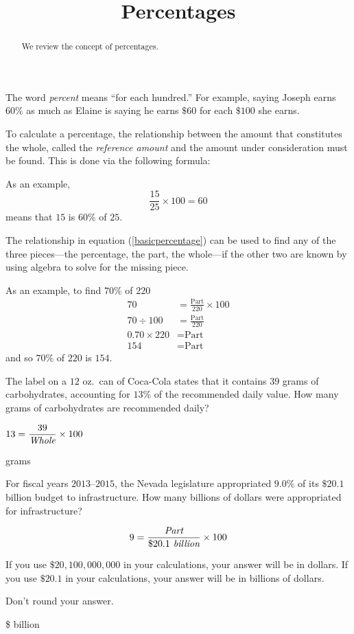 \documentclass{ximera}
\title{Percentages}
\begin{document}
\begin{abstract}
We review the concept of percentages.
\end{abstract}
\maketitle

The word \emph{percent} means ``for each hundred.'' For example, saying Joseph earns $60\%$ as much as Elaine is saying he earns $\$60$ for each $\$100$ she earns.

To calculate a percentage, the relationship between the amount that constitutes the whole, called the \emph{reference amount} and the amount under consideration must be found. This is done via the following formula:



As an example,
\[
\frac{15}{25}\times 100=60
\]
means that $15$ is $60\%$ of $25$.

The relationship in equation (\ref{basicpercentage}) can be used to find any of the three pieces---the percentage, the part, the whole---if the other two are known by using algebra to solve for the missing piece.

As an example, to find $70\%$ of $220$
\begin{align*}
70&=\frac{\text{Part}}{220}\times 100\\
70\div 100 &=\frac{\text{Part}}{220}\\
0.70\times 220 &=\text{Part}\\
154&=\text{Part}
\end{align*}
and so $70\%$ of $220$ is $154$.

\begin{question}
The label on a $12$ oz.\ can of Coca-Cola states that it contains $39$ grams of carbohydrates, accounting for $13$\% of the recommended daily value. How many grams of carbohydrates are recommended daily?

\begin{hint}
$\displaystyle 13=\frac{39}{\emph{\text{Whole}}}\times 100$
\end{hint}
 grams

\end{question}


\begin{question}
For fiscal years $2013$--$2015$, the Nevada legislature appropriated $9.0\%$ of its $\$20.1$ billion budget to infrastructure. How many billions of dollars were appropriated for infrastructure? 	

\begin{hint}
\[9=\frac{\emph{\text{Part}}}{\$20.1\emph{\text{ billion}}}\times 100\]
\end{hint}
\begin{hint}
If you use $\$20,100,000,000$ in your calculations, your answer will be in dollars. If you use $\$20.1$ in your calculations, your answer will be in billions of dollars.
\end{hint}
\begin{hint}
Don't round your answer.
\end{hint}
\$ billion

\end{question}
\end{document}
